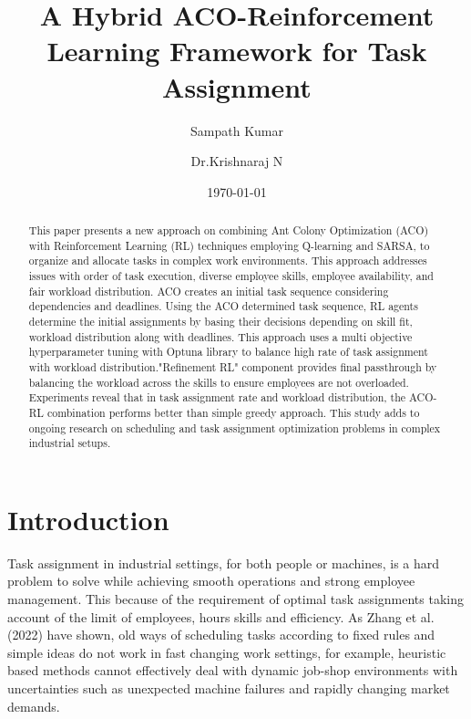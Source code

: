 \documentclass[%
aip,
cp,  %
reprint
]{revtex4-2}
\begin{document}
	
	\title{A Hybrid ACO-Reinforcement Learning Framework for Task Assignment}
	
	\author{Sampath Kumar}
	
	\author{Dr.Krishnaraj N}
	
	\date{\today}
	
	\begin{abstract}
		This paper presents a new approach on combining Ant Colony Optimization (ACO)
		with Reinforcement Learning (RL) techniques employing Q-learning and SARSA,
		to organize and allocate tasks in complex work environments. This approach addresses
		issues with order of task execution, diverse employee skills, employee availability,
		and fair workload distribution. ACO creates an initial task sequence considering
		dependencies and deadlines. Using the ACO determined task sequence, RL agents
		determine the initial assignments by basing their decisions depending on skill
		fit, workload distribution along with deadlines. This approach uses a multi objective
		hyperparameter tuning with Optuna library to balance high rate of task assignment
		with workload distribution."Refinement RL" component provides final passthrough
		by balancing the workload across the skills to ensure employees are not overloaded.
		Experiments reveal that in task assignment rate and workload distribution, the
		ACO-RL combination performs better than simple greedy approach. This study
		adds to ongoing research on scheduling and task assignment optimization
		problems in complex industrial setups.
	\end{abstract}
	
	
	\maketitle
	
	\section{\label{sec:intro}Introduction}
	Task assignment in industrial settings, for both people or machines, is a hard
	problem to solve while achieving smooth operations and strong employee management.
	This because of the requirement of optimal task assignments taking account of the limit of employees, hours skills and  efficiency. As Zhang et al. (2022) have shown, old ways of scheduling tasks according to fixed rules and simple ideas do not work in fast changing work settings, for example, heuristic based methods cannot effectively deal with dynamic job-shop environments with uncertainties such as unexpected machine failures and rapidly changing market demands\cite{zhang2022, li2024}.
	
\end{document}
